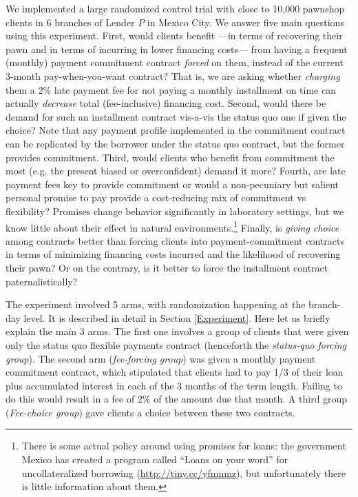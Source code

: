 \documentclass[oneside,11pt]{article}
\begin{document}
We implemented a large randomized control trial with close to 10,000 pawnshop clients in 6 branches of Lender $P$ in Mexico City. We answer five main questions using this experiment. First, would clients benefit  ---in terms of recovering their pawn and in terms of incurring in lower financing costs---  from having a frequent (monthly) payment commitment contract \textit{forced} on them, instead of the current 3-month pay-when-you-want contract? That is, we are asking whether \textit{charging} them a 2\% late payment fee for not paying a monthly installment on time can actually \textit{decrease} total (fee-inclusive) financing cost. Second, would there be demand for such an installment contract vis-a-vis the status quo one if given the choice? Note that any payment profile implemented in the commitment contract can be replicated by the borrower under the status quo contract, but the former provides commitment. Third, would clients who benefit from commitment the most (e.g. the present biased or overconfident) demand it more? Fourth, are late payment fees key to provide commitment or would a non-pecuniary but salient personal promise to pay provide a cost-reducing mix of commitment vs flexibility? Promises change behavior significantly in laboratory settings, but we know little about their effect in natural environments.\footnote{%
There is some actual policy around using promises for loans: the government Mexico has created a program called ``Loans on your word'' for uncollateralized borrowing (\url{http://tiny.cc/yfmnmz}), but unfortunately there is little information about them.} Finally, is \textit{giving choice} among contracts better than forcing clients into payment-commitment contracts in terms of minimizing financing costs incurred and the likelihood of recovering their pawn? Or on the contrary, is it better to force the installment contract 
paternalistically?

The experiment involved 5 arms, with randomization happening at the branch-day level. It is described in detail in Section \ref{Experiment}. Here let us briefly explain the main 3 arms. The first one involves a group of clients that were given only the status quo flexible payments contract (henceforth the \textit{status-quo forcing group}). The second arm (\textit{fee-forcing group}) was given a monthly payment commitment contract, which stipulated that clients had to pay 1/3 of their loan plus accumulated interest in each of the 3 months of the term length. Failing to do this would result in a fee of 2\% of the amount due that month. A third group (\textit{Fee-choice group}) gave clients a choice between these two contracts. 
\end{document}
